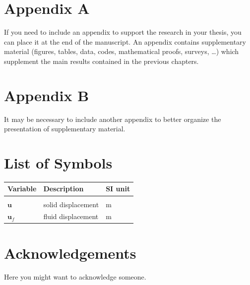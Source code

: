 \documentclass{Configuration_Files/PoliMi3i_thesis}
\begin{document}



\cleardoublepage
{} %
\appendix
\chapter{Appendix A}
If you need to include an appendix to support the research in your thesis, you can place it at the end of the manuscript.
An appendix contains supplementary material (figures, tables, data, codes, mathematical proofs, surveys, \dots)
which supplement the main results contained in the previous chapters.

\chapter{Appendix B}
It may be necessary to include another appendix to better organize the presentation of supplementary material.


\listoffigures

\listoftables

\chapter*{List of Symbols} %
\begin{table}[H]
    \centering
    \begin{tabular}{lll}
        \textbf{Variable} & \textbf{Description} & \textbf{SI unit} \\\hline\\[-9px]
        $\bm{u}$ & solid displacement & m \\[2px]
        $\bm{u}_f$ & fluid displacement & m \\[2px]
    \end{tabular}
\end{table}

\chapter*{Acknowledgements}
Here you might want to acknowledge someone.

\cleardoublepage
\end{document}
